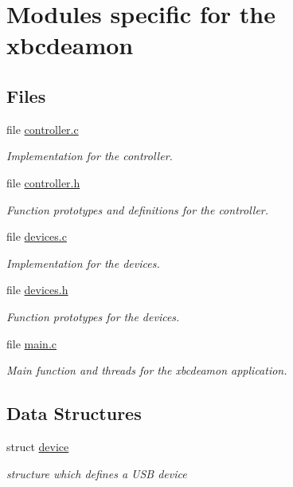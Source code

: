 \hypertarget{group__xbcdeamon}{\section{Modules specific for the xbcdeamon}
\label{group__xbcdeamon}
}
\subsection*{Files}
\begin{DoxyCompactItemize}
\item 
file \hyperlink{controller_8c}{controller.\-c}
\begin{DoxyCompactList}\small\item\em Implementation for the controller. \end{DoxyCompactList}\item 
file \hyperlink{controller_8h}{controller.\-h}
\begin{DoxyCompactList}\small\item\em Function prototypes and definitions for the controller. \end{DoxyCompactList}\item 
file \hyperlink{devices_8c}{devices.\-c}
\begin{DoxyCompactList}\small\item\em Implementation for the devices. \end{DoxyCompactList}\item 
file \hyperlink{devices_8h}{devices.\-h}
\begin{DoxyCompactList}\small\item\em Function prototypes for the devices. \end{DoxyCompactList}\item 
file \hyperlink{xbcdaemon_2main_8c}{main.\-c}
\begin{DoxyCompactList}\small\item\em Main function and threads for the xbcdeamon application. \end{DoxyCompactList}\end{DoxyCompactItemize}
\subsection*{Data Structures}
\begin{DoxyCompactItemize}
\item 
struct \hyperlink{structdevice}{device}
\begin{DoxyCompactList}\small\item\em structure which defines a U\-S\-B device \end{DoxyCompactList}\end{DoxyCompactItemize}
